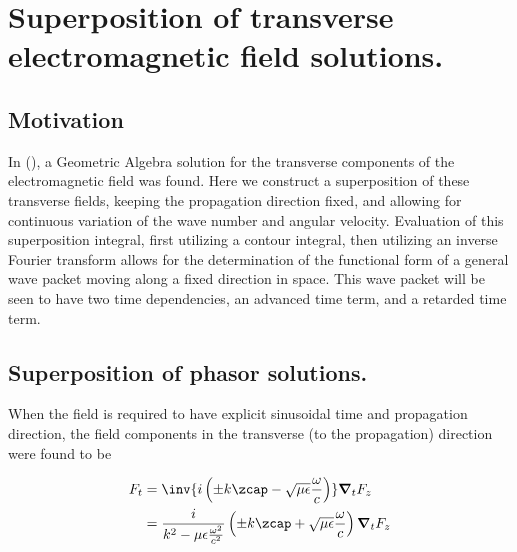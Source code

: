 

\chapter{Superposition of transverse electromagnetic field solutions.}
\label{chap:waveguideRetardedAdvanced}
{}
\date{August 1, 2009}

\beginArtWithToc

\section{Motivation}

In (\cite{transverseField}), a Geometric Algebra solution for the transverse components of the electromagnetic field was found.  Here we construct a superposition of these transverse fields, keeping the propagation direction fixed, and allowing for continuous variation of the wave number and angular velocity.  Evaluation of this superposition integral, first utilizing a contour integral, then utilizing an inverse Fourier transform allows for the determination of the functional form of a general wave packet moving along a fixed direction in space.  This wave packet will be seen to have two time dependencies, an advanced time term, and a retarded time term.


\section{Superposition of phasor solutions.}

When the field is required to have explicit sinusoidal time and propagation direction, the field components in the transverse (to the propagation) direction were found to be

\begin{align}\label{eqn:waveguideRetardedAdvanced:foo7}
F_t &= \inv{i \left( \pm k \zcap - \sqrt{\mu\epsilon}\frac{\omega}{c}\right) } \spacegrad_t F_z \\
&= \frac{i}{k^2 - \mu\epsilon\frac{\omega^2}{c^2}} \left( \pm k \zcap + \sqrt{\mu\epsilon}\frac{\omega}{c}\right) \spacegrad_t F_z
\end{align}

